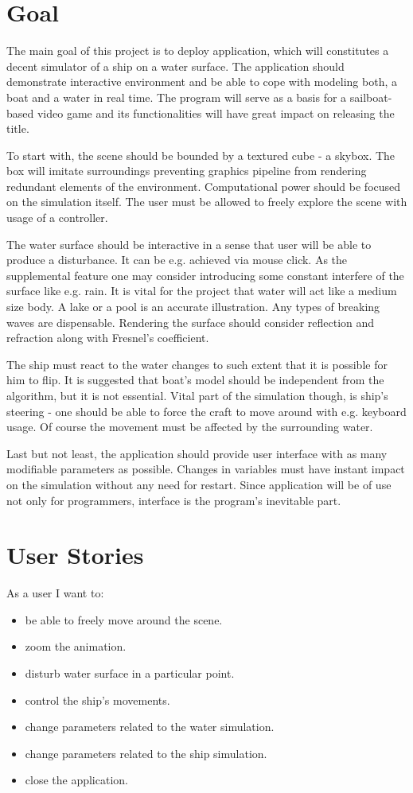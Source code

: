\documentclass{report}
\begin{document}
\section{Goal}
The main goal of this project is to deploy application, which will constitutes a decent simulator of a ship on a water surface. The application should demonstrate interactive environment and be able to cope with modeling both, a boat and a water in real time. The program will serve as a basis for a sailboat-based video game and its functionalities will
have great impact on releasing the title.

To start with, the scene should be bounded by a textured cube - a skybox. The box will imitate surroundings preventing graphics pipeline from rendering redundant elements of the environment. Computational power should be focused on the simulation itself. The user must be allowed to freely explore the scene with usage of a controller.

The water surface should be interactive in a sense that user will be able to produce a disturbance. It can be e.g. achieved via mouse click. As the supplemental feature one may consider introducing some constant interfere of the surface like e.g. rain. It is vital for the project that water will act like a medium size body. A lake or a pool is an accurate illustration. Any types of breaking waves are dispensable. Rendering the surface should consider reflection and refraction along with Fresnel’s coefficient.

The ship must react to the water changes to such extent that it is possible for him to flip. It is suggested that boat’s model should be independent from the algorithm, but it is not essential. Vital part of the simulation though, is ship’s steering - one should be able to force the craft to move around with e.g. keyboard usage. Of course the movement must
be affected by the surrounding water.

Last but not least, the application should provide user interface with as many modifiable parameters as possible. Changes in variables must have instant impact on the simulation without any need for restart. Since application will be of use not only for programmers, interface is the program’s inevitable part.

\section{User Stories}
As a user I want to:
\begin{itemize}
\item be able to freely move around the scene.
\item zoom the animation.
\item disturb water surface in a particular point.
\item control the ship’s movements.
\item change parameters related to the water simulation.
\item change parameters related to the ship simulation.
\item close the application.
\end{itemize}
\end{document}
